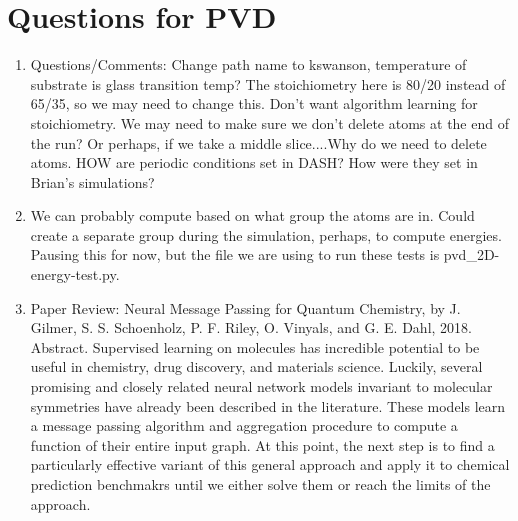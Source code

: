 \documentclass[12pt,reqno]{amsart}
\numberwithin{equation}{section}
\begin{document}
\section{Questions for PVD}
\begin{enumerate}
\item Questions/Comments: Change path name to kswanson, temperature of substrate is glass transition temp? The stoichiometry here is 80/20 instead of 65/35, so we may need to change this.  Don't want algorithm learning for stoichiometry.   We may need to make sure we don't delete atoms at the end of the run?  Or perhaps, if we take a middle slice....Why do we need to delete atoms.  HOW are periodic conditions set in DASH?  How were they set in Brian's simulations?
\item We can probably compute based on what group the atoms are in.  Could create a separate group during the simulation, perhaps, to compute energies.  Pausing this for now, but the file we are using to run these tests is pvd\_2D-energy-test.py.  
\item Paper Review: Neural Message Passing for Quantum Chemistry, by J. Gilmer, S. S. Schoenholz, P. F. Riley, O. Vinyals, and G. E. Dahl, 2018.  
\subitem Abstract.  Supervised learning on molecules has incredible potential to be useful in chemistry, drug discovery, and materials science.  Luckily, several promising and closely related neural network models invariant to molecular symmetries have already been described in the literature.  These models learn a message passing algorithm and aggregation procedure to compute a function of their entire input graph.  At this point, the next step is to find a particularly effective variant of this general approach and apply it to chemical prediction benchmakrs until we either solve them or reach the limits of the approach.  

\end{enumerate}
\end{document}
